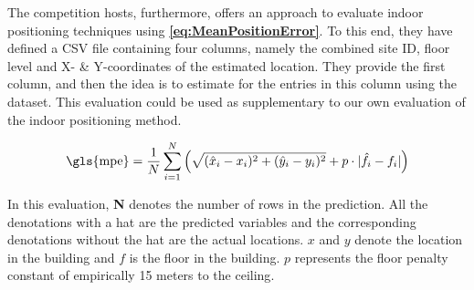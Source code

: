 The competition hosts, furthermore, offers an approach to evaluate indoor positioning techniques using \textbf{\autoref{eq:MeanPositionError}}. To this end, they have defined a CSV file containing four columns, namely the combined site ID, floor level and X- \& Y-coordinates of the estimated location. They provide the first column, and then the idea is to estimate for the entries in this column using the dataset. This evaluation could be used as supplementary to our own evaluation of the indoor positioning method.

\begin{equation} \label{eq:MeanPositionError}
\text{\gls{mpe}} = \frac{1}{N} \sum_{i=1}^{N}  
                                                \left( \sqrt{( \hat{x}_i - x_i )^{2} + ( \hat{y}_i - y_i )^{2}} 
                                                + p \cdot | \hat{f}_{i} - f_i | \right) 
\end{equation}

In this evaluation, \textbf{N} denotes the number of rows in the prediction. All the denotations with a hat are the predicted variables and the corresponding denotations without the hat are the actual locations. $x$ and $y$ denote the location in the building and $f$ is the floor in the building. $p$ represents the floor penalty constant of empirically 15 meters to the ceiling\cite{MicrosoftConversation}.

